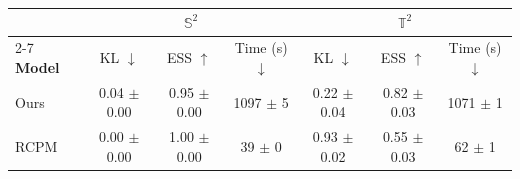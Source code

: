 \begin{tabular}{lcccccc}
\hline
 & \multicolumn{3}{c|}{$\mathbb{S}^{2}$} & \multicolumn{3}{c}{$\mathbb{T}^{2}$} \\
\cline{2-7}
 \textbf{Model} & KL $\downarrow$ & ESS $\uparrow$ & Time (s) $\downarrow$
 & KL $\downarrow$ & ESS $\uparrow$ & Time (s) $\downarrow$\\
\hline
Ours & 0.04 $\pm$ 0.00 & 0.95 $\pm$ 0.00 & 1097 $\pm$ 5 & 0.22 $\pm$ 0.04 & 0.82 $\pm$ 0.03 & 1071 $\pm$ 1 \\
RCPM~\citep{lou2020neural} & 0.00 $\pm$ 0.00 & 1.00 $\pm$ 0.00 & 39 $\pm$ 0 & 0.93 $\pm$ 0.02 & 0.55 $\pm$ 0.03 & 62 $\pm$ 1 \\
\hline
\end{tabular}